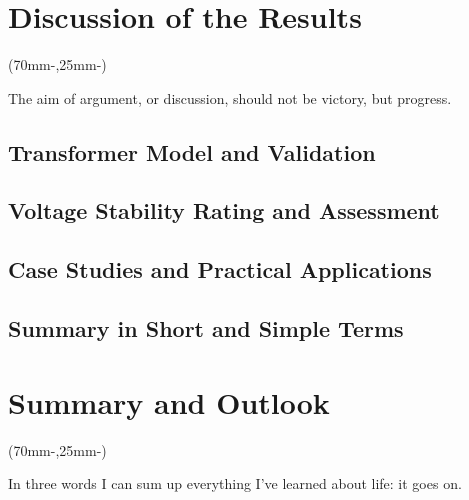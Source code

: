 

\chapter{Discussion of the Results}
\label{chap:discussion}

\begin{textblock*}{.7\textwidth}(70mm-\offset,25mm-\offset)
    \begin{fquote}
        The aim of argument, or discussion, should not be victory, but progress.
    \end{fquote}
\end{textblock*}

\section{Transformer Model and Validation}

\section{Voltage Stability Rating and Assessment}

\section{Case Studies and Practical Applications}

\section{Summary in Short and Simple Terms}

\chapter{Summary and Outlook}
\label{chap:summary}

\begin{textblock*}{.7\textwidth}(70mm-\offset,25mm-\offset)
    \begin{fquote}
        In three words I can sum up everything I've learned about life: it goes on.
    \end{fquote}
\end{textblock*}


